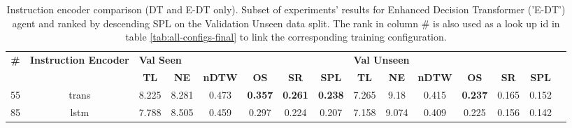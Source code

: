 \begin{table}
\centering
\caption{\label{tab:e_dt_instruction_encoding}Instruction encoder comparison (DT and E-DT only). Subset of experiments' results for Enhanced Decision Transformer ('E-DT') agent and ranked by descending SPL on the Validation Unseen data split. The rank in column \# is also used as a look up id in table \ref{tab:all-configs-final} to link the corresponding training configuration.}
\begin{tabular}{@{\hskip3pt}c@{\hskip3pt}c@{\hskip3pt}c@{\hskip3pt}c@{\hskip3pt}c@{\hskip3pt}c@{\hskip3pt}c@{\hskip3pt}c@{\hskip3pt}c@{\hskip3pt}c@{\hskip3pt}c@{\hskip3pt}c@{\hskip3pt}c@{\hskip3pt}c@{\hskip3pt}c}
\toprule
\textbf{\#} & \textbf{Instruction Encoder} & \multicolumn{6}{l}{\textbf{Val Seen}} & \multicolumn{6}{l}{\textbf{Val Unseen}} \\
 \textbf{~} &                   \textbf{~} &       \textbf{TL} & \textbf{NE} & \textbf{nDTW} &     \textbf{OS} &     \textbf{SR} &    \textbf{SPL} &         \textbf{TL} & \textbf{NE} & \textbf{nDTW} &     \textbf{OS} & \textbf{SR} & \textbf{SPL} \\
\midrule
         55 &                        trans &             8.225 &       8.281 &         0.473 &  \textbf{0.357} &  \textbf{0.261} &  \textbf{0.238} &               7.265 &        9.18 &         0.415 &  \textbf{0.237} &       0.165 &        0.152 \\
         85 &                         lstm &             7.788 &       8.505 &         0.459 &           0.297 &           0.224 &           0.207 &               7.158 &       9.074 &         0.409 &           0.225 &       0.156 &        0.142 \\
\bottomrule
\end{tabular}
\end{table}
